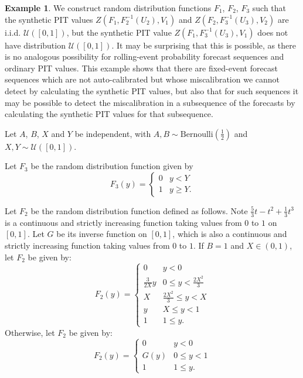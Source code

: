 \documentclass[aap]{imsart}
\theoremstyle{plain}
\theoremstyle{definition}
\newtheorem{example}[theorem]{Example}
\begin{document}
\begin{example}
  We construct random distribution functions $F_1$, $F_2$, $F_3$ such that the synthetic PIT values $Z(F_1, F_2^{-1}(U_2), V_1)$ and $Z(F_2, F_3^{-1}(U_3), V_2)$ are i.i.d. $\mathcal{U}([0,1])$, but the synthetic PIT value $Z(F_1, F_3^{-1}(U_3), V_1)$ does not have distribution $\mathcal{U}([0,1])$. It may be surprising that this is possible, as there is no analogous possibility for rolling-event probability forecast sequences and ordinary PIT values. This example shows that there are fixed-event forecast sequences which are not auto-calibrated but whose miscalibration we cannot detect by calculating the synthetic PIT values, but also that for such sequences it may be possible to detect the miscalibration in a subsequence of the forecasts by calculating the synthetic PIT values for that subsequence.

Let $A$, $B$, $X$ and $Y$ be independent, with $A, B \sim \text{Bernoulli}\left(\frac{1}{2}\right)$ and $X, Y \sim \mathcal{U}([0,1])$.

Let $F_3$ be the random distribution function given by
\begin{equation*}
  F_3(y) = \begin{cases}
    0 & y < Y \\
    1 & y \geq Y.
  \end{cases}
\end{equation*}

Let $F_2$ be the random distribution function defined as follows. Note $\frac{5}{3}t - t^2 + \frac{1}{3}t^3$ is a continuous and strictly increasing function taking values from $0$ to $1$ on $[0,1]$. Let $G$ be its inverse function on $[0,1]$, which is also a continuous and strictly increasing function taking values from $0$ to $1$. If $B = 1$ and $X \in (0,1)$, let $F_2$ be given by:
\begin{equation*}
  F_2(y) = \begin{cases}
    0             & y < 0 \\
    \frac{3}{2X}y & 0 \leq y < \frac{2 X^2}{3} \\
    X             & \frac{2 X^2}{3} \leq y < X \\
    y             & X \leq y < 1 \\
    1             & 1 \leq y.
  \end{cases}
\end{equation*}
Otherwise, let $F_2$ be given by:
\begin{equation*}
  F_2(y) = \begin{cases}
    0    & y < 0 \\
    G(y) & 0 \leq y < 1 \\
    1    & 1 \leq y.
  \end{cases}
\end{equation*}


\end{example}
\end{document}
